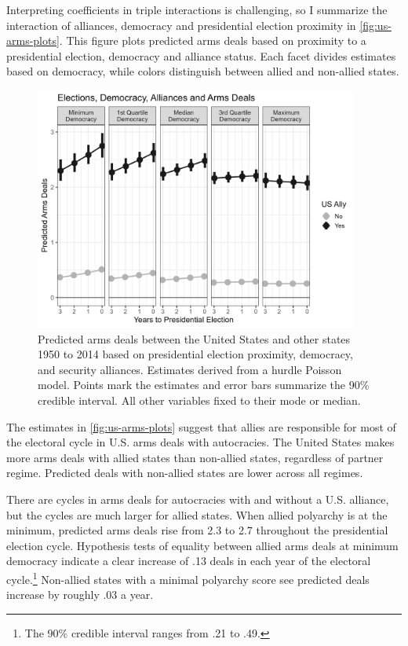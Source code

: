 \documentclass[12pt]{article}
\begin{document}
Interpreting coefficients in triple interactions is challenging, so I summarize the interaction of alliances, democracy and presidential election proximity in \autoref{fig:us-arms-plots}.
This figure plots predicted arms deals based on proximity to a presidential election, democracy and alliance status. 
Each facet divides estimates based on democracy, while colors distinguish between allied and non-allied states. 


\begin{figure}[htpb]
	\centering
		\includegraphics[width=0.95\textwidth]{../figures/us-arms-plots.png}
	\caption{Predicted arms deals between the United States and other states 1950 to 2014 based on presidential election proximity, democracy, and security alliances. Estimates derived from a hurdle Poisson model. Points mark the estimates and error bars summarize the 90\% credible interval. All other variables fixed to their mode or median.}
	\label{fig:us-arms-plots}
\end{figure}


The estimates in \autoref{fig:us-arms-plots} suggest that allies are responsible for most of the electoral cycle in U.S. arms deals with autocracies. 
The United States makes more arms deals with allied states than non-allied states, regardless of partner regime. 
Predicted deals with non-allied states are lower across all regimes. 


There are cycles in arms deals for autocracies with and without a U.S. alliance, but the cycles are much larger for allied states. 
When allied polyarchy is at the minimum, predicted arms deals rise from 2.3 to 2.7 throughout the presidential election cycle.
Hypothesis tests of equality between allied arms deals at minimum democracy indicate a clear increase of .13 deals in each year of the electoral cycle.\footnote{The 90\% credible interval ranges from .21 to .49.}
Non-allied states with a minimal polyarchy score see predicted deals increase by roughly .03 a year.
\end{document}
